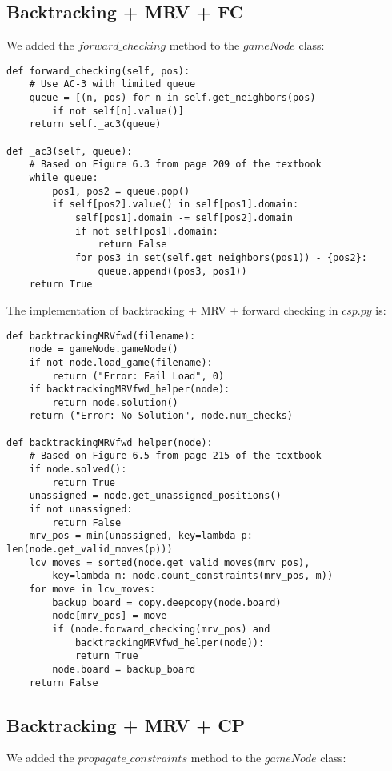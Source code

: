 \documentclass[11pt]{article}
\begin{document}
\subsection{Backtracking + MRV + FC}

We added the $forward\_checking$ method to the $gameNode$ class:

\lstset{language=Python}
\begin{lstlisting}[frame=single]
def forward_checking(self, pos):
	# Use AC-3 with limited queue
	queue = [(n, pos) for n in self.get_neighbors(pos)
		if not self[n].value()]
	return self._ac3(queue)

def _ac3(self, queue):
	# Based on Figure 6.3 from page 209 of the textbook
	while queue:
		pos1, pos2 = queue.pop()
		if self[pos2].value() in self[pos1].domain:
			self[pos1].domain -= self[pos2].domain
			if not self[pos1].domain:
				return False
			for pos3 in set(self.get_neighbors(pos1)) - {pos2}:
				queue.append((pos3, pos1))
	return True
\end{lstlisting}

The implementation of backtracking + MRV + forward checking in $csp.py$ is:

\lstset{language=Python}
\begin{lstlisting}[frame=single]
def backtrackingMRVfwd(filename):
	node = gameNode.gameNode()
	if not node.load_game(filename):
		return ("Error: Fail Load", 0)
	if backtrackingMRVfwd_helper(node):
		return node.solution()
	return ("Error: No Solution", node.num_checks)

def backtrackingMRVfwd_helper(node):
	# Based on Figure 6.5 from page 215 of the textbook
	if node.solved():
		return True
	unassigned = node.get_unassigned_positions()
	if not unassigned:
		return False
	mrv_pos = min(unassigned, key=lambda p: len(node.get_valid_moves(p)))
	lcv_moves = sorted(node.get_valid_moves(mrv_pos),
		key=lambda m: node.count_constraints(mrv_pos, m))
	for move in lcv_moves:
		backup_board = copy.deepcopy(node.board)
		node[mrv_pos] = move
		if (node.forward_checking(mrv_pos) and
			backtrackingMRVfwd_helper(node)):
			return True
		node.board = backup_board
	return False
\end{lstlisting}


\subsection{Backtracking + MRV + CP}

We added the $propagate\_constraints$ method to the $gameNode$ class:
\end{document}
